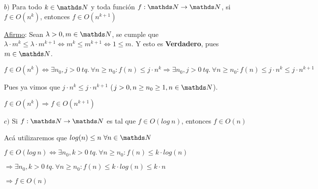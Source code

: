\documentclass[10pt,a4paper]{article}
\begin{document}
\par $b)$ Para todo \ensuremath{k \in \nat} y toda función \ensuremath{f: \nat \rightarrow \nat}, si \ensuremath{f \in O(n^k)}, entonces \ensuremath{f \in O(n^{k+1})}
\demoline
\begin{groupIzq}{2.5em}
  \par \underline{Afirmo}: Sean \ensuremath{\lambda > 0, m \in \nat}, se cumple que \ensuremath{\lambda \cdot m^k \leq \lambda \cdot m^{k+1} \Leftrightarrow m^k \leq m^{k+1} \Leftrightarrow 1 \leq m}. Y esto es \textbf{Verdadero}, pues \ensuremath{m \in \nat}.
  \par \ensuremath{f \in O(n^k) \Leftrightarrow \exists n_0, j > 0\ tq.\ \forall n \geq n_0 : f(n) \leq j \cdot n^k \Rightarrow \exists n_0, j > 0\ tq.\ \forall n \geq n_0 : f(n) \leq j \cdot n^k \leq j \cdot n^{k+1}}
  \par Pues ya vimos que \ensuremath{j \cdot n^k \leq j \cdot n^{k+1}} (\ensuremath{j > 0, n \geq n_0 \geq 1, n \in \nat}).
  \par \ensuremath{f \in O(n^k) \Rightarrow f \in O(n^{k+1})}
\end{groupIzq}
\demoline
\demoline

\par $c)$ Si \ensuremath{f: \nat \rightarrow \nat} es tal que \ensuremath{f \in O(log\ n)}, entonces \ensuremath{f \in O(n)}
\demoline
\begin{groupIzq}{2.5em}
  \par Acá utilizaremos que \ensuremath{log(n) \leq n\ \forall n \in \nat}
  \par \ensuremath{f \in O(log\ n) \Leftrightarrow \exists n_0, k > 0\ tq.\ \forall n \geq n_0 : f(n) \leq k \cdot log(n)}
  \par \hspace{6em}\ensuremath{\Rightarrow \exists n_0, k > 0\ tq.\ \forall n \geq n_0 : f(n) \leq k \cdot log(n) \leq k \cdot n}
  \par \hspace{6em}\ensuremath{\Rightarrow f \in O(n)}
\end{groupIzq}

\newpage
\end{document}
